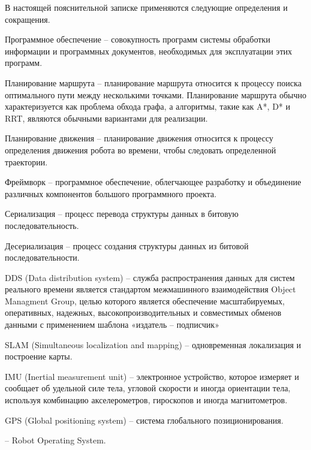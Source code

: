 В настоящей пояснительной записке применяются следующие определения и
сокращения.

Программное обеспечение -- совокупность программ системы обработки
информации и программных документов, необходимых для эксплуатации этих
программ.

Планирование маршрута -- планирование маршрута относится к процессу
поиска оптимального пути между несколькими точками. Планирование маршрута обычно
характеризуется как проблема обхода графа, а алгоритмы, такие как A*, D* и RRT,
являются обычными вариантами для реализации.

Планирование движения -- планирование движения относится к процессу
определения движения робота во времени, чтобы следовать определенной
траектории.

Фреймворк -- программное обеспечение, облегчающее разработку и
объединение различных компонентов большого программного проекта.

Сериализация -- процесс перевода структуры данных в битовую последовательность.

Десериализация -- процесс создания структуры данных из битовой последовательности.

DDS (Data distribution system) -- служба распространения данных для систем
реального времени является стандартом межмашинного взаимодействия Object
Managment Group, целью которого является обеспечение масштабируемых,
оперативных, надежных, высокопроизводительных и совместимых обменов данными с
применением шаблона «издатель -- подписчик»

SLAM (Simultaneous localization and mapping) -- одновременная локализация и
построение карты.

IMU (Inertial measurement unit) -- электронное устройство, которое измеряет и
сообщает об удельной силе тела, угловой скорости и иногда ориентации тела,
используя комбинацию акселерометров, гироскопов и иногда магнитометров. 

GPS (Global positioning system) -- система глобального позиционирования.



\ros{} -- Robot Operating System.
